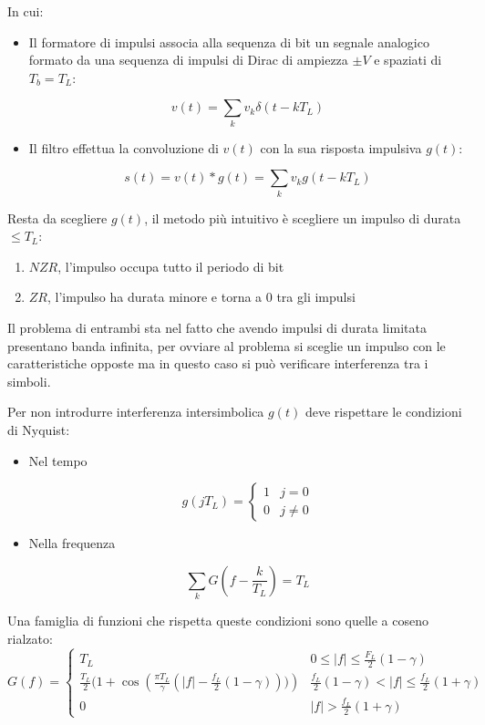 \documentclass{article}
\begin{document}
\noindent In cui:
\begin{itemize}
    \item Il formatore di impulsi associa alla sequenza di bit un segnale analogico formato da una sequenza di impulsi di Dirac di ampiezza $\pm V$ e spaziati di $T_b=T_L$:

        $$v(t)=\sum_kv_k\delta(t-kT_L)$$

    \item Il filtro effettua la convoluzione di $v(t)$ con la sua risposta impulsiva $g(t)$:

    $$s(t)=v(t)*g(t)=\sum_kv_kg(t-kT_L)$$\newline
    
\end{itemize}

\noindent Resta da scegliere $g(t)$, il metodo più intuitivo è scegliere un impulso di durata $\leq T_L$:
\begin{enumerate}
    \item $NZR$, l'impulso occupa tutto il periodo di bit
    \item $ZR$, l'impulso ha durata minore e torna a 0 tra gli impulsi\newline
\end{enumerate}

\noindent Il problema di entrambi sta nel fatto che avendo impulsi di durata limitata presentano banda infinita, per ovviare al problema si sceglie un impulso con le caratteristiche opposte ma in questo caso si può verificare interferenza tra i simboli.\newline

\noindent Per non introdurre interferenza intersimbolica $g(t)$ deve rispettare le condizioni di Nyquist:
\begin{itemize}
    \item Nel tempo

        \[g(jT_L)=\begin{cases}
            1 & j=0\\
            0 & j\neq 0
        \end{cases}\]

    \item Nella frequenza

        $$\sum_kG(f-\frac{k}{T_L})=T_L$$\newline
    
\end{itemize}

\noindent Una famiglia di funzioni che rispetta queste condizioni sono quelle a coseno rialzato:
\[G(f)=\begin{cases}
    T_L & 0\leq|f|\leq\frac{F_L}{2}(1-\gamma)\\
    \frac{T_L}{2}(1+\cos({\frac{\pi T_L}{\gamma}(|f|-\frac{f_L}{2}(1-\gamma)))}) & \frac{f_L}{2}(1-\gamma)<|f|\leq\frac{f_L}{2}(1+\gamma)\\
    0 & |f|>\frac{f_L}{2}(1+\gamma)
\end{cases}\]
\end{document}
